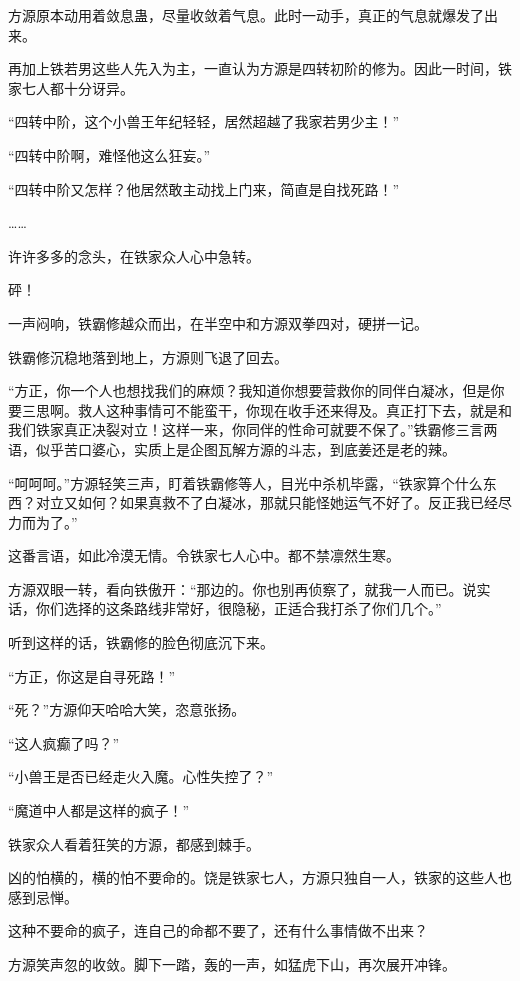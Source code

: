 
\begin{this_body}

方源原本动用着敛息蛊，尽量收敛着气息。此时一动手，真正的气息就爆发了出来。

再加上铁若男这些人先入为主，一直认为方源是四转初阶的修为。因此一时间，铁家七人都十分讶异。

“四转中阶，这个小兽王年纪轻轻，居然超越了我家若男少主！”

“四转中阶啊，难怪他这么狂妄。”

“四转中阶又怎样？他居然敢主动找上门来，简直是自找死路！”

……

许许多多的念头，在铁家众人心中急转。

砰！

一声闷响，铁霸修越众而出，在半空中和方源双拳四对，硬拼一记。

铁霸修沉稳地落到地上，方源则飞退了回去。

“方正，你一个人也想找我们的麻烦？我知道你想要营救你的同伴白凝冰，但是你要三思啊。救人这种事情可不能蛮干，你现在收手还来得及。真正打下去，就是和我们铁家真正决裂对立！这样一来，你同伴的性命可就要不保了。”铁霸修三言两语，似乎苦口婆心，实质上是企图瓦解方源的斗志，到底姜还是老的辣。

“呵呵呵。”方源轻笑三声，盯着铁霸修等人，目光中杀机毕露，“铁家算个什么东西？对立又如何？如果真救不了白凝冰，那就只能怪她运气不好了。反正我已经尽力而为了。”

这番言语，如此冷漠无情。令铁家七人心中。都不禁凛然生寒。

方源双眼一转，看向铁傲开：“那边的。你也别再侦察了，就我一人而已。说实话，你们选择的这条路线非常好，很隐秘，正适合我打杀了你们几个。”

听到这样的话，铁霸修的脸色彻底沉下来。

“方正，你这是自寻死路！”

“死？”方源仰天哈哈大笑，恣意张扬。

“这人疯癫了吗？”

“小兽王是否已经走火入魔。心性失控了？”

“魔道中人都是这样的疯子！”

铁家众人看着狂笑的方源，都感到棘手。

凶的怕横的，横的怕不要命的。饶是铁家七人，方源只独自一人，铁家的这些人也感到忌惮。

这种不要命的疯子，连自己的命都不要了，还有什么事情做不出来？

方源笑声忽的收敛。脚下一踏，轰的一声，如猛虎下山，再次展开冲锋。


\end{this_body}

